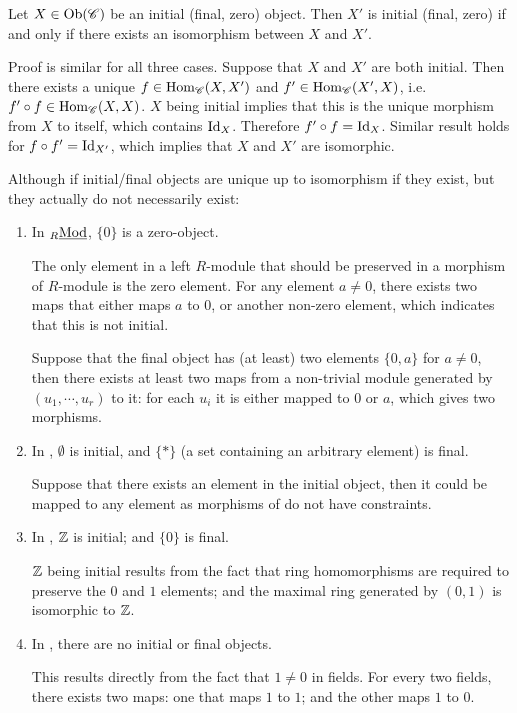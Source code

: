 \documentclass{article}
\begin{document}
\begin{remark}
    Let $X \in \mathrm{Ob}(\mathscr{C})$ be an initial (final, zero) object. Then $X'$ is initial (final, zero) if and only if there exists an isomorphism between $X$ and $X'$.

    Proof is similar for all three cases. Suppose that $X$ and $X'$ are both initial. Then there exists a unique $f \in \mathrm{Hom}_{\mathscr{C}}(X, X')$ and $f'\in \mathrm{Hom}_{\mathscr{C}}(X', X)$, i.e. $f' \circ f \in \mathrm{Hom}_{\mathscr{C}}(X, X)$. $X$ being initial implies that this is the unique morphism from $X$ to itself, which contains $\mathrm{Id}_{X}$. Therefore $f' \circ f = \mathrm{Id}_{X}$. Similar result holds for $f \circ f' = \mathrm{Id}_{X'}$, which implies that $X$ and $X'$ are isomorphic.
\end{remark}

\begin{example}
    Although if initial/final objects are unique up to isomorphism if they exist, but they actually do not necessarily exist:
    \begin{enumerate}
        \item In ${}_{R}\underline{\textup{Mod}}$, $\{0\}$ is a zero-object. 
        
        The only element in a left $R$-module that should be preserved in a morphism of $R$-module is the zero element. For any element $a \neq 0$, there exists two maps that either maps $a$ to 0, or another non-zero element, which indicates that this is not initial. 

        Suppose that the final object has (at least) two elements $\{0, a\}$ for $a \neq 0$, then there exists at least two maps from a non-trivial module generated by $(u_1, \cdots, u_r)$ to it: for each $u_i$ it is either mapped to $0$ or $a$, which gives two morphisms. 
        \item In \catsets, $\emptyset$ is initial, and $\{\ast\}$ (a set containing an arbitrary element) is final.
        
        Suppose that there exists an element in the initial object, then it could be mapped to any element as morphisms of \catsets do not have constraints. 
        \item In \catrings, $\mathbb{Z}$ is initial; and $\{0\}$ is final. 
        
        $\mathbb{Z}$ being initial results from the fact that ring homomorphisms are required to preserve the $0$ and $1$ elements; and the maximal ring generated by $(0, 1)$ is isomorphic to $\mathbb{Z}$.
        \item In \catfields, there are no initial or final objects.
        
        This results directly from the fact that $1 \neq 0$ in fields. For every two fields, there exists two maps: one that maps $1$ to $1$; and the other maps $1$ to $0$.
    \end{enumerate}
\end{example}
\end{document}
